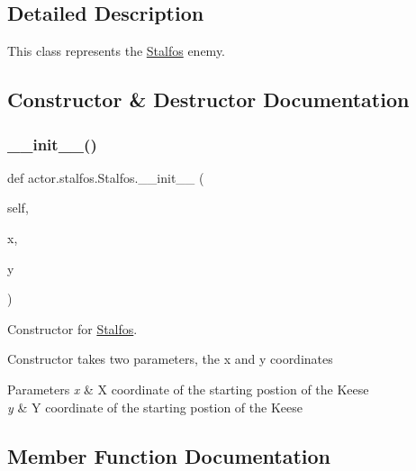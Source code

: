 \subsection{Detailed Description}
This class represents the \hyperlink{classactor_1_1stalfos_1_1_stalfos}{Stalfos} enemy. 

\subsection{Constructor \& Destructor Documentation}
\mbox{\label{classactor_1_1stalfos_1_1_stalfos_ad8c4e62f51605d1b83c80e21263334af}} 
\subsubsection{\texorpdfstring{\+\_\+\+\_\+init\+\_\+\+\_\+()}{\_\_init\_\_()}}
{\footnotesize\ttfamily def actor.\+stalfos.\+Stalfos.\+\_\+\+\_\+init\+\_\+\+\_\+ (\begin{DoxyParamCaption}\item[{}]{self,  }\item[{}]{x,  }\item[{}]{y }\end{DoxyParamCaption})}



Constructor for \hyperlink{classactor_1_1stalfos_1_1_stalfos}{Stalfos}. 

Constructor takes two parameters, the x and y coordinates 
\begin{DoxyParams}{Parameters}
{\em x} & X coordinate of the starting postion of the Keese \\
\hline
{\em y} & Y coordinate of the starting postion of the Keese \\
\hline
\end{DoxyParams}


\subsection{Member Function Documentation}
\mbox{\label{classactor_1_1stalfos_1_1_stalfos_adea3ec3198efffc7015efb4b49a44a69}} 
